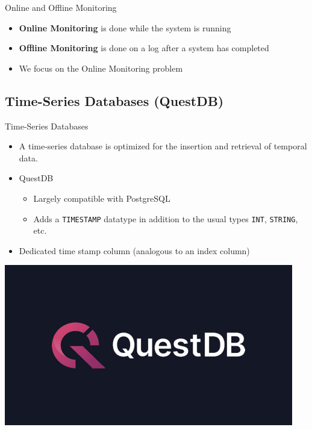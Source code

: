 \begin{frame}{Online and Offline Monitoring}
    \begin{itemize}
        \item \textbf{Online Monitoring} is done while the system is running
        \item \textbf{Offline Monitoring} is done on a log after a system has completed
        \item We focus on the Online Monitoring problem
    \end{itemize}
    
\end{frame}


\subsection{Time-Series Databases (QuestDB)}


\begin{frame}{Time-Series Databases}
    \begin{itemize}
        \item A time-series database is optimized for the insertion and retrieval of temporal data.
        \item QuestDB
        \begin{itemize}
            \item Largely compatible with PostgreSQL
            \item Adds a {\color{red} \texttt{TIMESTAMP}} datatype in addition to the usual types \texttt{INT}, \texttt{STRING}, etc.
        \end{itemize}
        \item Dedicated time stamp column (analogous to an index column)
    \end{itemize}
    \vspace{0.6cm}
    \centering
    \includegraphics[width=0.5\linewidth]{diagrams/questdb.png}
    
\end{frame}

